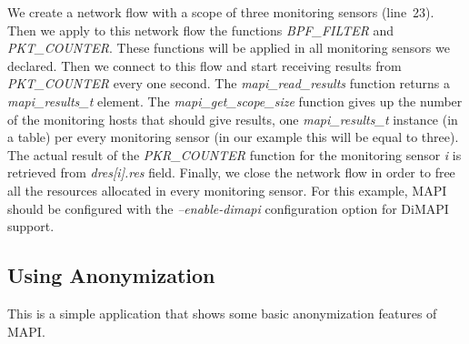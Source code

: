 \documentclass[a4paper, 11pt]{article}
\begin{document}
We create a network flow with a scope of three monitoring sensors (line~23).
Then we apply to this network flow the functions \textit{BPF\_FILTER} and 
\textit{PKT\_COUNTER}. These functions will be applied in all monitoring
sensors we declared. Then we connect to this flow and start receiving results from \textit{PKT\_COUNTER}
every one second. The \textit{mapi\_read\_results} function returns a 
\textit{mapi\_results\_t} element. The \textit{mapi\_get\_scope\_size} function gives up the
number of the monitoring hosts that should give results, 
one \textit{mapi\_results\_t} instance (in a table) per every monitoring sensor 
(in our example this will be equal to three). 
The actual result of the \textit{PKR\_COUNTER} function
for the monitoring sensor \textit{i} is retrieved from \textit{dres[i].res} field.
Finally, we close the network flow in order to free all the
resources allocated in every monitoring sensor.
For this example, MAPI should be configured with the \textit{--enable-dimapi} configuration option
for DiMAPI support.


\subsection{Using Anonymization}

This is a simple application that shows some basic anonymization features of MAPI.
\end{document}
